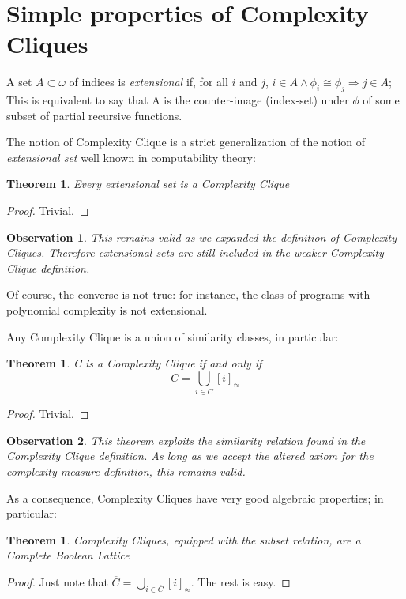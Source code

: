 \documentclass[10pt, a4paper, oneside, titlepage, draft]{article}
\newtheorem{observation}{Observation}[shrd]
\newtheorem{theorem}[shrd]{Theorem}
\begin{document}
\section{Simple properties of Complexity Cliques}
A set $A \subset \omega$ of indices is \emph{extensional} if, for all $i$ and $j$, $i \in A \wedge \phi_i \cong \phi_j \Rightarrow j \in A$; This is equivalent to say that A is the counter-image (index-set) under $\phi$ of some subset of partial recursive functions.

The notion of Complexity Clique is a strict generalization of the notion of \emph{extensional set} well known in computability theory:

\begin{theorem}
    Every extensional set is a Complexity Clique
\end{theorem}

\begin{proof}
    Trivial.
\end{proof}

\begin{observation}
    This remains valid as we expanded the definition of Complexity Cliques. Therefore extensional sets are still included in the weaker Complexity Clique definition.
\end{observation}

Of course, the converse is not true: for instance, the class of programs with polynomial complexity is not extensional.

Any Complexity Clique is a union of similarity classes, in particular:

\begin{theorem}
    C is a Complexity Clique if and only if
    \begin{equation*}
        C = \bigcup_{i \in C} [i]_{\approx}
    \end{equation*}
\end{theorem}

\begin{proof}
    Trivial.
\end{proof}

\begin{observation}
    This theorem exploits the similarity relation found in the Complexity Clique definition. As long as we accept the altered axiom for the complexity measure definition, this remains valid.
\end{observation}

As a consequence, Complexity Cliques have very good algebraic properties; in particular:
\begin{theorem}
    Complexity Cliques, equipped with the subset relation, are a Complete Boolean Lattice
\end{theorem}
\begin{proof}
    Just note that $\overline{C} = \bigcup_{i \in \overline{C}}[i]_{\approx}$. The rest is easy.
\end{proof}
\end{document}
